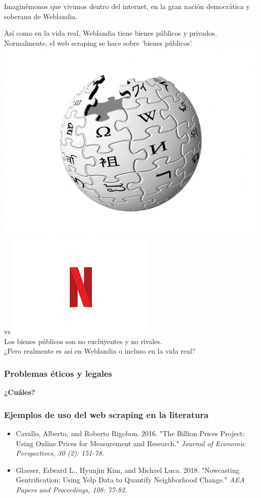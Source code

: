 \documentclass{beamer}
\begin{document}
\begin{frame}
	\begin{alertblock}{ }
		\centering
		Imaginémonos que vivimos dentro del internet, en la gran nación democrática y soberana de Weblandia.
	\end{alertblock}
	\centering
	Así como en la vida real, Weblandia tiene bienes públicos y privados. \\
	Normalmente, el web scraping se hace sobre 'bienes públicos'.  \\
	\includegraphics[width=.2\linewidth]{wikipedia.jpg} \large{vs} 
	\includegraphics[width=.2\linewidth]{netflix.png}  \\

	Los bienes públicos son no excluyentes y no rivales. \\
	¿Pero realmente es así en Weblandia o incluso en la vida real?

\end{frame}

\begin{frame}
	\frametitle{Problemas éticos y legales}
	\begin{alertblock}{ }
		\centering
		\textbf{¿Cuáles?}
	\end{alertblock}
	
\end{frame}


\begin{frame}
	\frametitle{Ejemplos de uso del web scraping en la literatura}
	\begin{itemize}
		\item Cavallo, Alberto, and Roberto Rigobon. 2016. "The Billion Prices Project: Using Online Prices for Measurement and Research." \textit{Journal of Economic Perspectives, 30 (2): 151-78.}
		\item Glaeser, Edward L., Hyunjin Kim, and Michael Luca. 2018. "Nowcasting Gentrification: Using Yelp Data to Quantify Neighborhood Change." \textit{AEA Papers and Proceedings, 108: 77-82.}
	\end{itemize}
\end{frame}
\end{document}
